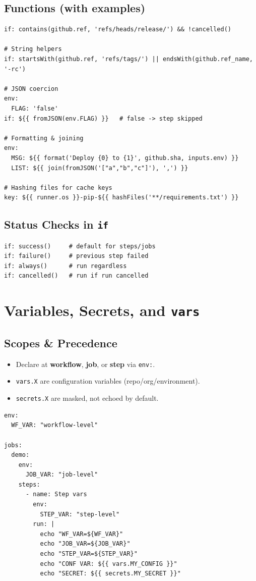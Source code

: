 \documentclass[11pt]{article}
\begin{document}
\subsection{Functions (with examples)}
\begin{verbatim}
if: contains(github.ref, 'refs/heads/release/') && !cancelled()

# String helpers
if: startsWith(github.ref, 'refs/tags/') || endsWith(github.ref_name, '-rc')

# JSON coercion
env:
  FLAG: 'false'
if: ${{ fromJSON(env.FLAG) }}   # false -> step skipped

# Formatting & joining
env:
  MSG: ${{ format('Deploy {0} to {1}', github.sha, inputs.env) }}
  LIST: ${{ join(fromJSON('["a","b","c"]'), ',') }}

# Hashing files for cache keys
key: ${{ runner.os }}-pip-${{ hashFiles('**/requirements.txt') }}
\end{verbatim}

\subsection{Status Checks in \texttt{if}}
\begin{verbatim}
if: success()     # default for steps/jobs
if: failure()     # previous step failed
if: always()      # run regardless
if: cancelled()   # run if run cancelled
\end{verbatim}
\clearpage

\section{Variables, Secrets, and \texttt{vars}}
\subsection{Scopes \& Precedence}
\begin{itemize}
  \item Declare at \textbf{workflow}, \textbf{job}, or \textbf{step} via \texttt{env:}.
  \item \texttt{vars.X} are configuration variables (repo/org/environment).
  \item \texttt{secrets.X} are masked, not echoed by default.
\end{itemize}
\begin{verbatim}
env:
  WF_VAR: "workflow-level"

jobs:
  demo:
    env:
      JOB_VAR: "job-level"
    steps:
      - name: Step vars
        env:
          STEP_VAR: "step-level"
        run: |
          echo "WF_VAR=${WF_VAR}"
          echo "JOB_VAR=${JOB_VAR}"
          echo "STEP_VAR=${STEP_VAR}"
          echo "CONF VAR: ${{ vars.MY_CONFIG }}"
          echo "SECRET: ${{ secrets.MY_SECRET }}"
\end{verbatim}
\end{document}
